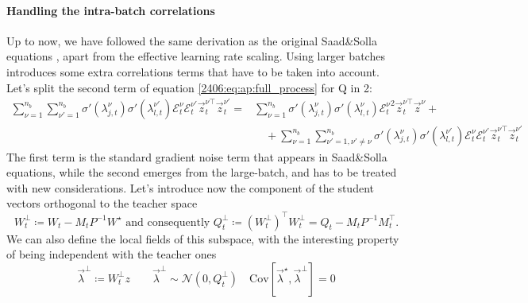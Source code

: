 \paragraph{Handling the intra-batch correlations}
Up to now, we have followed the same derivation as the original Saad\&Solla equations \cite{saad1995line}, apart from the effective learning rate scaling. Using larger batches introduces some extra correlations terms that have to be taken into account. Let's split the second term of equation \eqref{2406:eq:ap:full_process} for Q in 2:
\[\begin{split}
    \sum_{\nu = 1}^{n_b} \sum_{\nu' = 1}^{n_b} \sigma'(\lambda_{j,t}^\nu)\sigma'(\lambda_{l,t}^{\nu'})\mathcal{E}_t^\nu\mathcal{E}_t^{\nu'} \vec z^{\nu\top}_t \vec z_t^{\nu'} =&
    \sum_{\nu = 1}^{n_b} \sigma'(\lambda_{j,t}^\nu) \sigma'(\lambda_{l,t}^\nu){\mathcal{E}_t^\nu}^2 \vec z^{\nu\top}_t \vec z^{\nu}
    + \\ & \quad +
    \sum_{\nu = 1}^{n_b} \sum_{\nu' = 1, \nu'\neq\nu}^{n_b} \sigma'(\lambda_{j,t}^\nu)\sigma'(\lambda_{l,t}^{\nu'})\mathcal{E}_t^\nu\mathcal{E}_t^{\nu'} \vec z^{\nu\top}_t \vec z_t^{\nu'}
\end{split}\]
The first term is the standard gradient noise term that appears in Saad\&Solla equations, while the second emerges from the large-batch, and has to be treated with new considerations.
Let's introduce now the component of the student vectors orthogonal to the teacher space 
\[
W_t^\bot \coloneqq W_t - M_tP^{-1}W^\star \text{ and consequently }
Q_t^\bot \coloneqq \left(W_t^\bot\right)^\top W_t^\bot = Q_t - M_tP^{-1}M_t^\top.
\]
We can also define the local fields of this subspace, with the interesting property of being independent with the teacher ones
\[
\vec \lambda^\bot \coloneqq W_t^\bot z \qquad
\vec \lambda^\bot \sim \mathcal N (0,Q_t^\bot) \quad
\text{Cov}[\vec \lambda^\star, \vec \lambda^\bot] = 0
\]

